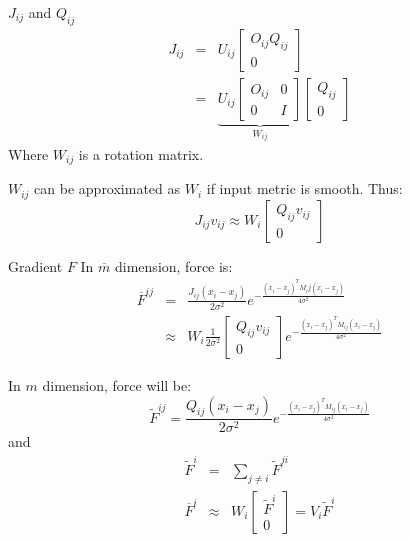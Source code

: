\documentclass{beamer}
\begin{document}
\begin{frame}{$J_{ij}$ and $Q_{ij}$}
\begin{eqnarray*}
J_{ij}&=&U_{ij}\left [ \begin{array}{cc} O_{ij}Q_{ij} \\ 0\end{array}  \right ]\\
&=&\underbrace{U_{ij}\left [ \begin{array}{cc} O_{ij} & 0 \\ 0 & I \end{array} \right ]}_{W_{ij}}\left [ \begin{array}{cc} Q_{ij} \\ 0\end{array}  \right ]
\end{eqnarray*}
Where $W_{ij}$ is a rotation matrix.

$W_{ij}$ can be approximated as $W_i$ if input metric is smooth. Thus:
\[J_{ij}v_{ij}\approx W_i \left [ \begin{array}{cc} Q_{ij}v_{ij} \\ 0\end{array}  \right ]\]
\end{frame}

\begin{frame}{Gradient $F$}
In $\overline{m}$ dimension, force is:
\begin{eqnarray*}
\overline{F}^{ij}&=&\frac{J_{ij}(x_i-x_j)}{2\sigma^2}e^{-\frac{(x_i-x_j)^TM_ij(x_i-x_j)}{4\sigma^2}}\\
&\approx&W_i\frac{1}{2\sigma^2}\left [ \begin{array}{cc} Q_{ij}v_{ij} \\ 0 \end{array}\right ] e^{-\frac{(x_i-x_j)^TM_{ij}(x_i-x_j)}{4\sigma^2}}
\end{eqnarray*}

In $m$ dimension, force will be:
\[\widetilde{F}^{ij}=\frac{Q_{ij}(x_i-x_j)}{2\sigma^2}e^{-\frac{(x_i-x_j)^TM_{ij}(x_i-x_j)}{4\sigma^2}}\]
and 
\begin{eqnarray*}
\widetilde{F}^i &=& \sum_{j\neq i} \widetilde{F}^{ji} \\
\overline{F}^i &\approx& W_i \left [ \begin{array}{cc} \widetilde{F}^i \\ 0\end{array}\right] = V_i \widetilde{F}^i 
\end{eqnarray*}
\end{frame}
\end{document}
